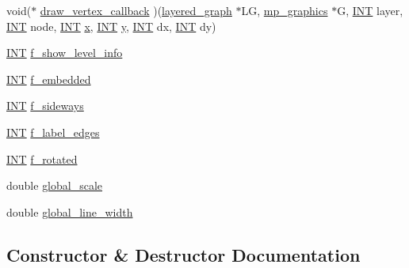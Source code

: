 \begin{DoxyCompactItemize}
\item 
void($\ast$ \mbox{\hyperlink{classlayered__graph__draw__options_aeff04f23419d7e9f5d61e3871ab9e1dd}{draw\+\_\+vertex\+\_\+callback}} )(\mbox{\hyperlink{classlayered__graph}{layered\+\_\+graph}} $\ast$LG, \mbox{\hyperlink{classmp__graphics}{mp\+\_\+graphics}} $\ast$G, \mbox{\hyperlink{galois_8h_a09fddde158a3a20bd2dcadb609de11dc}{I\+NT}} layer, \mbox{\hyperlink{galois_8h_a09fddde158a3a20bd2dcadb609de11dc}{I\+NT}} node, \mbox{\hyperlink{galois_8h_a09fddde158a3a20bd2dcadb609de11dc}{I\+NT}} \mbox{\hyperlink{alphabet2_8_c_a6150e0515f7202e2fb518f7206ed97dc}{x}}, \mbox{\hyperlink{galois_8h_a09fddde158a3a20bd2dcadb609de11dc}{I\+NT}} \mbox{\hyperlink{alphabet2_8_c_a0a2f84ed7838f07779ae24c5a9086d33}{y}}, \mbox{\hyperlink{galois_8h_a09fddde158a3a20bd2dcadb609de11dc}{I\+NT}} dx, \mbox{\hyperlink{galois_8h_a09fddde158a3a20bd2dcadb609de11dc}{I\+NT}} dy)
\item 
\mbox{\hyperlink{galois_8h_a09fddde158a3a20bd2dcadb609de11dc}{I\+NT}} \mbox{\hyperlink{classlayered__graph__draw__options_a7630d1562c7fb430f8d9f083a9c87810}{f\+\_\+show\+\_\+level\+\_\+info}}
\item 
\mbox{\hyperlink{galois_8h_a09fddde158a3a20bd2dcadb609de11dc}{I\+NT}} \mbox{\hyperlink{classlayered__graph__draw__options_a899756199451c39a7cdb41598c2db413}{f\+\_\+embedded}}
\item 
\mbox{\hyperlink{galois_8h_a09fddde158a3a20bd2dcadb609de11dc}{I\+NT}} \mbox{\hyperlink{classlayered__graph__draw__options_a3dc02ec518e25cac2b14ccda85a43641}{f\+\_\+sideways}}
\item 
\mbox{\hyperlink{galois_8h_a09fddde158a3a20bd2dcadb609de11dc}{I\+NT}} \mbox{\hyperlink{classlayered__graph__draw__options_a9f61fe1c3214421e486aba36dbc4723b}{f\+\_\+label\+\_\+edges}}
\item 
\mbox{\hyperlink{galois_8h_a09fddde158a3a20bd2dcadb609de11dc}{I\+NT}} \mbox{\hyperlink{classlayered__graph__draw__options_a7c5f575308980cb592e8a3e7ff35771c}{f\+\_\+rotated}}
\item 
double \mbox{\hyperlink{classlayered__graph__draw__options_abdfbe480a6c3a45c084bc3832592e0f2}{global\+\_\+scale}}
\item 
double \mbox{\hyperlink{classlayered__graph__draw__options_a87567e7c1df6663cc33706ae4e0fd5b6}{global\+\_\+line\+\_\+width}}
\end{DoxyCompactItemize}


\subsection{Constructor \& Destructor Documentation}
\mbox{\label{classlayered__graph__draw__options_a51a621cff05f067587ce444a491e176f}} 
